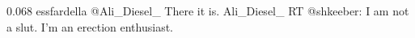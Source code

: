 %
%
{0.068}
{\joinNameTweet
{essfardella}
{@Ali\_Diesel\_ There it is.}}
{\joinNameTweet
{Ali\_Diesel\_}
{RT @shkeeber: I am not a slut.    I'm an erection enthusiast.}}
%
%
%
%
%

